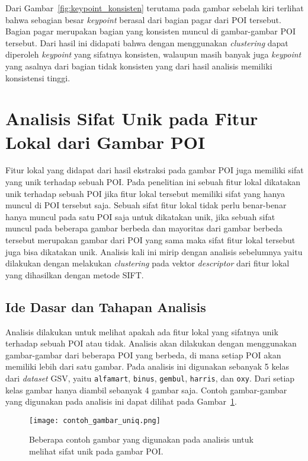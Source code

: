 Dari Gambar~\ref{fig:keypoint_konsisten} terutama pada gambar sebelah kiri terlihat bahwa sebagian besar \textit{keypoint} berasal dari bagian pagar dari POI tersebut. Bagian pagar merupakan bagian yang konsisten muncul di gambar-gambar POI tersebut. Dari hasil ini didapati bahwa dengan menggunakan \textit{clustering} dapat diperoleh \textit{keypoint} yang sifatnya konsisten, walaupun masih banyak juga \textit{keypoint} yang asalnya dari bagian tidak konsisten yang dari hasil analisis memiliki konsistensi tinggi.

\section{Analisis Sifat Unik pada Fitur Lokal dari Gambar POI}
\label{sec:analisis_keunikan}
Fitur lokal yang didapat dari hasil ekstraksi pada gambar POI juga memiliki sifat yang unik terhadap sebuah POI. Pada penelitian ini sebuah fitur lokal dikatakan unik terhadap sebuah POI jika fitur lokal tersebut memiliki sifat yang hanya muncul di POI tersebut saja. Sebuah sifat fitur lokal tidak perlu benar-benar hanya muncul pada satu POI saja untuk dikatakan unik, jika sebuah sifat muncul pada beberapa gambar berbeda dan mayoritas dari gambar berbeda tersebut merupakan gambar dari POI yang sama maka sifat fitur lokal tersebut juga bisa dikatakan unik. Analisis kali ini mirip dengan analisis sebelumnya yaitu dilakukan dengan melakukan \textit{clustering} pada vektor \textit{descriptor} dari fitur lokal yang dihasilkan dengan metode SIFT.

\subsection{Ide Dasar dan Tahapan Analisis}
Analisis dilakukan untuk melihat apakah ada fitur lokal yang sifatnya unik terhadap sebuah POI atau tidak. Analisis akan dilakukan dengan menggunakan gambar-gambar dari beberapa POI yang berbeda, di mana setiap POI akan memiliki lebih dari satu gambar. Pada analisis ini digunakan sebanyak 5 kelas dari \textit{dataset} GSV, yaitu \texttt{alfamart}, \texttt{binus}, \texttt{gembul}, \texttt{harris}, dan \texttt{oxy}. Dari setiap kelas gambar hanya diambil sebanyak 4 gambar saja. Contoh gambar-gambar yang digunakan pada analisis ini dapat dilihat pada Gambar~\ref{fig:analisis_uniqueness}. 
\begin{figure}[H]
	\centering
	\texttt{[image: contoh\_gambar\_uniq.png]}	
	\caption{Beberapa contoh gambar yang digunakan pada analisis untuk melihat sifat unik pada gambar POI.}
	\label{fig:analisis_uniqueness}
\end{figure}

